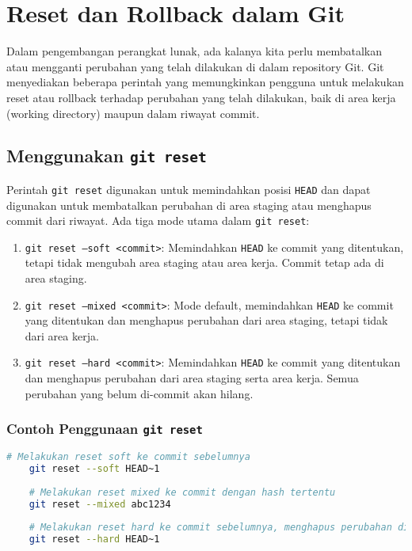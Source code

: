 \chapter{Reset dan Rollback dalam Git}

Dalam pengembangan perangkat lunak, ada kalanya kita perlu membatalkan atau mengganti perubahan yang telah dilakukan di dalam repository Git. Git menyediakan beberapa perintah yang memungkinkan pengguna untuk melakukan reset atau rollback terhadap perubahan yang telah dilakukan, baik di area kerja (working directory) maupun dalam riwayat commit.

\section{Menggunakan \texttt{git reset}}

Perintah \texttt{git reset} digunakan untuk memindahkan posisi \texttt{HEAD} dan dapat digunakan untuk membatalkan perubahan di area staging atau menghapus commit dari riwayat. Ada tiga mode utama dalam \texttt{git reset}:

\begin{enumerate}
	\item \texttt{git reset --soft <commit>}: Memindahkan \texttt{HEAD} ke commit yang ditentukan, tetapi tidak mengubah area staging atau area kerja. Commit tetap ada di area staging.
	\item \texttt{git reset --mixed <commit>}: Mode default, memindahkan \texttt{HEAD} ke commit yang ditentukan dan menghapus perubahan dari area staging, tetapi tidak dari area kerja.
	\item \texttt{git reset --hard <commit>}: Memindahkan \texttt{HEAD} ke commit yang ditentukan dan menghapus perubahan dari area staging serta area kerja. Semua perubahan yang belum di-commit akan hilang.
\end{enumerate}

\subsection{Contoh Penggunaan \texttt{git reset}}

\begin{lstlisting}[language=bash]
	# Melakukan reset soft ke commit sebelumnya
	git reset --soft HEAD~1
	
	# Melakukan reset mixed ke commit dengan hash tertentu
	git reset --mixed abc1234
	
	# Melakukan reset hard ke commit sebelumnya, menghapus perubahan di area kerja
	git reset --hard HEAD~1
\end{lstlisting}

